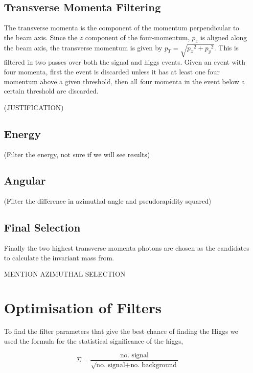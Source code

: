 \documentclass[11pt]{amsart}
\begin{document}
\begin{multicols}{2}
\subsection{Transverse Momenta Filtering}

The transverse momenta is the component of the momentum perpendicular to the beam axis. Since the $z$ component of the four-momentum, $p_z$ is aligned along the beam axis, the transverse momentum is given by $p_T = \sqrt{{p_x}^2 + {p_y}^2}$. This is filtered in two passes over both the signal and higgs events. Given an event with four momenta, first the event is discarded unless it has at least one four momentum above a given threshold, then all four momenta in the event below a certain threshold are discarded.

(JUSTIFICATION)

\subsection{Energy}

(Filter the energy, not sure if we will see results)

\subsection{Angular}

(Filter the difference in azimuthal angle and pseudorapidity squared)

\subsection{Final Selection}

Finally the two highest transverse momenta photons are chosen as the candidates to calculate the invariant mass from.

MENTION AZIMUTHAL SELECTION


\section{Optimisation of Filters}

To find the filter parameters that give the best chance of finding the Higgs we used the formula for the statistical significance of the higgs,

\begin{equation}
  \label{eq:significance}
  \Sigma = \frac{\text{no. signal}}{\sqrt{\text{no. signal} + \text{no. background}}}
\end{equation}


\end{multicols}
\end{document}
